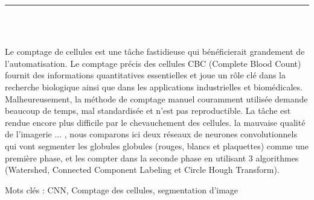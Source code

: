 \documentclass[12pt]{report}
\newenvironment{changemargin}[2]{%
\begin{list}{}{%
\setlength{\topsep}{0pt}%
\setlength{\leftmargin}{#1}%
\setlength{\rightmargin}{#2}%
\setlength{\listparindent}{\parindent}%
\setlength{\itemindent}{\parindent}%
\setlength{\parsep}{\parskip}%
}%
\item[]}{\end{list}}
\begin{document}


\newpage



\newpage



\newpage

\vspace*{0.2in}

\thispagestyle{empty}

\begin{center}
    {\color{Black} \rule{3in}{1.4mm} }\\
    \vspace{0.1in}
    \scshape{\fontsize{34}{46}{\bfseries{\color{Black}{Résumé}}}}
    \\
    \vspace{0.6in}
\end{center}
\begin{changemargin}{0.9cm}{0.9cm}
\hspace*{0.16in}
\end{changemargin}

Le comptage de cellules est une tâche fastidieuse qui bénéficierait grandement de l'automatisation. Le comptage précis des cellules CBC (Complete Blood Count) fournit des informations quantitatives essentielles et joue un rôle clé dans la recherche biologique ainsi que dans les applications industrielles et biomédicales. Malheureusement, la méthode de comptage manuel couramment utilisée demande beaucoup de temps, mal standardisée et n'est pas reproductible. La tâche est rendue encore plus difficile par le chevauchement des cellules. la mauvaise qualité de l'imagerie ... , nous comparons ici deux réseaux de neurones convolutionnels qui vont segmenter les globules globules (rouges, blancs et plaquettes) comme une première phase, et les compter dans la seconde phase en utilisant 3 algorithmes (Watershed, Connected Component Labeling et Circle Hough Transform).

\vspace{1in}

\begin{changemargin}{0.9cm}{0.9cm}
Mots clés : CNN, Comptage des cellules, segmentation d'image
\end{changemargin}

\newpage

\vspace*{0.2in}
\end{document}
